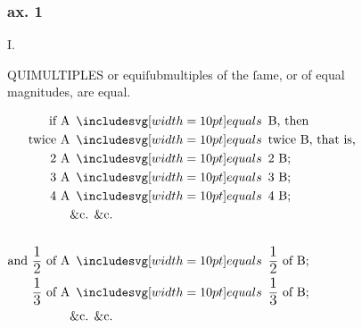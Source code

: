 \begin{center}
    \begin{minipage}{0.80\textwidth}
        \subsubsection{ax. 1}
        \begin{center}
            I.\label{book5ax1}\\
            \raggedright \lettrine[lines=4, loversize=1, nindent=0pt]{}{}QUIMULTIPLES or equiſubmultiples of the ſame, or of equal\\ magnitudes, are equal.
        \end{center}

        \hfill

        \hfill

        \centering

        $\begin{aligned}
                \text{if A}                                                       & \bequals \text{B, then}                                         \\
                \text{twice A}                                                    & \bequals \text{twice B, that is,}                               \\
                \text{2 A}                                                        & \bequals \text{2 B;}                                            \\
                \text{3 A}                                                        & \bequals \text{3 B;}                                            \\
                \text{4 A}                                                        & \bequals \text{4 B;}                                            \\
                                                                                  & \text{\&c. \&c.}                                                \\
                \hfill                                                                                                                              \\
                \text{and } \dfrac{\text{\large 1}}{\text{\large 2}} \text{ of A} & \bequals \dfrac{\text{\large 1}}{\text{\large 2}} \text{ of B;} \\
                \dfrac{\text{\large 1}}{\text{\large 3}} \text{ of A}             & \bequals \dfrac{\text{\large 1}}{\text{\large 3}} \text{ of B;} \\
                                                                                  & \text{\&c. \&c.}
            \end{aligned}$\\


\end{minipage}
\end{center}
